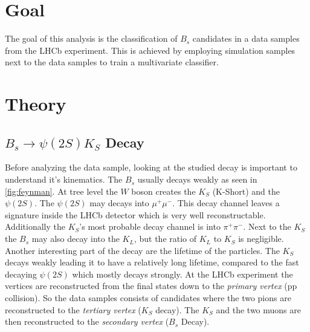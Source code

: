 \section{Goal}
\label{sec:Goal}

The goal of this analysis is the classification of $B_s$ candidates in a data samples from the LHCb experiment. This is achieved by employing simulation samples next to the data samples to train a  multivariate classifier.  

\section{Theory}
\label{sec:Theory}

\subsection{\texorpdfstring{$B_s \to \psi(2S)K_S$}{B_s -> Psi(2S)K_S} Decay}

Before analyzing the data sample, looking at the studied decay \signal is important to understand it's kinematics. The $B_s$ usually decays weakly as seen in \autoref{fig:feynman}. At tree level the $W$ boson creates the $K_S$ (K-Short) and the $\psi(2S)$. The $\psi(2S)$ may decays into $\mu^+\mu^-$. This decay channel leaves a signature inside the LHCb detector which is very well reconstructable. Additionally the $K_S$'s most probable decay channel is into $\pi^+\pi^-$. Next to the $K_S$ the $B_s$ may also decay into the $K_L$, but the ratio of $K_L$ to $K_S$ is negligible. Another interesting part of the decay are the lifetime of the particles. The $K_S$ decays weakly leading it to have a relatively long lifetime, compared to the fast decaying $\psi(2S)$ which mostly decays strongly. At the LHCb experiment the vertices are reconstructed from the final states down to the \textit{primary vertex} (pp collision). So the data samples consists of candidates where the two pions are reconstructed to the \textit{tertiary vertex} ($K_S$ decay). The $K_S$ and the two muons are then reconstructed to the \textit{secondary vertex} ($B_s$ Decay).

